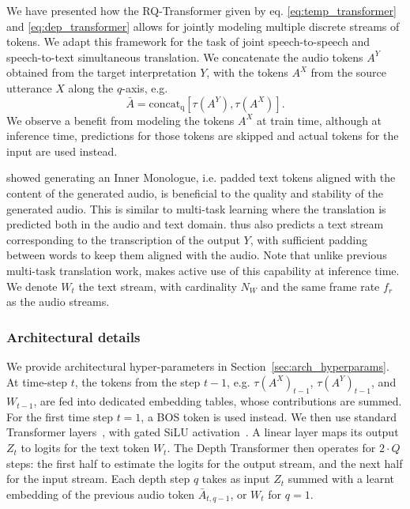 We have presented how the RQ-Transformer given by eq. \eqref{eq:temp_transformer} and \eqref{eq:dep_transformer} allows
for jointly modeling multiple discrete streams of tokens.
We adapt this framework for the task of joint speech-to-speech
and speech-to-text simultaneous translation.
We concatenate the audio tokens
$A^Y$ obtained from the target interpretation $Y$, with
the tokens $A^X$ from the source utterance $X$ along the $q$-axis, e.g. 
\begin{equation}
    \bar{A} = \mathrm{concat_q}\left[\tau(A^Y), \tau(A^X)\right].
\end{equation}
We observe a benefit from modeling the tokens $A^X$ at train time,
although at inference time, predictions for those tokens are skipped
and actual tokens for the input are used instead.

\citet{moshi} showed generating an Inner Monologue, i.e. padded text tokens aligned with the content of the generated audio, is beneficial to the quality
and stability of the generated audio. This is similar to multi-task learning where the translation is predicted both in the audio
and text domain. \ours thus also predicts a text stream corresponding
to the transcription of the output $Y$, with sufficient padding between words to keep them aligned with the audio. Note that unlike previous multi-task
translation work, \ours makes active use of this capability at inference time.
We denote $W_t$ the text stream, with cardinality $N_W$ and the same frame rate $f_r$
as the audio streams.

\subsubsection{Architectural details}
\label{sec:arch_details}

We provide architectural hyper-parameters in Section~\ref{sec:arch_hyperparams}.
At time-step $t$, the tokens from the step $t-1$, e.g. $\tau(A^X)_{t-1}$,
$\tau(A^Y)_{t-1}$, and $W_{t-1}$, are fed into dedicated embedding tables, whose contributions are summed.
For the first time step $t = 1$, a BOS token is used instead.
We then use standard Transformer layers~\citep{attentionvaswani}, with gated SiLU activation~\citep{shazeer2020glu,hendrycks2016gaussian}.
A linear layer maps its output $Z_t$ to logits for the text token $W_t$.
The Depth Transformer then operates for $2 \cdot Q$ steps:
the first half to estimate the logits for the output stream,
and the next half for the input stream.
Each depth step $q$ takes as input $Z_t$ summed with
a learnt embedding of the previous audio token $\bar{A}_{t, q - 1}$, or $W_t$ for $q = 1$.


